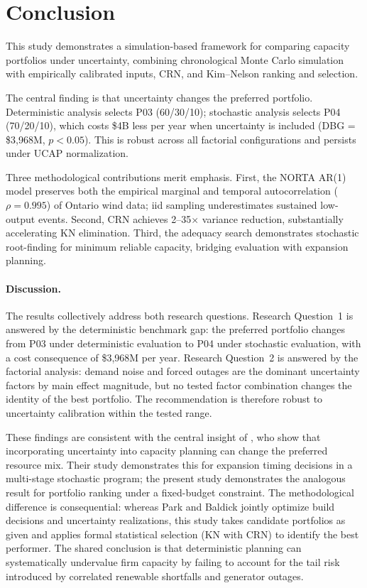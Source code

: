 \documentclass[11pt]{article}
\begin{document}
\section{Conclusion}\label{sec:conclusion}

This study demonstrates a simulation-based framework for comparing capacity portfolios under uncertainty, combining chronological Monte Carlo simulation with empirically calibrated inputs, CRN, and Kim--Nelson ranking and selection.

The central finding is that uncertainty changes the preferred portfolio. Deterministic analysis selects P03 (60/30/10); stochastic analysis selects P04 (70/20/10), which costs \$4B less per year when uncertainty is included (DBG = \$3,968M, $p < 0.05$). This is robust across all factorial configurations and persists under UCAP normalization.

Three methodological contributions merit emphasis. First, the NORTA AR(1) model preserves both the empirical marginal and temporal autocorrelation ($\rho = 0.995$) of Ontario wind data; iid sampling underestimates sustained low-output events. Second, CRN achieves 2--35$\times$ variance reduction, substantially accelerating KN elimination. Third, the adequacy search demonstrates stochastic root-finding for minimum reliable capacity, bridging evaluation with expansion planning.

\paragraph{Discussion.}
The results collectively address both research questions. Research Question~1 is answered by the deterministic benchmark gap: the preferred portfolio changes from P03 under deterministic evaluation to P04 under stochastic evaluation, with a cost consequence of \$3,968M per year. Research Question~2 is answered by the factorial analysis: demand noise and forced outages are the dominant uncertainty factors by main effect magnitude, but no tested factor combination changes the identity of the best portfolio. The recommendation is therefore robust to uncertainty calibration within the tested range.

These findings are consistent with the central insight of \citet{ParkBaldick2016}, who show that incorporating uncertainty into capacity planning can change the preferred resource mix. Their study demonstrates this for expansion timing decisions in a multi-stage stochastic program; the present study demonstrates the analogous result for portfolio ranking under a fixed-budget constraint. The methodological difference is consequential: whereas Park and Baldick jointly optimize build decisions and uncertainty realizations, this study takes candidate portfolios as given and applies formal statistical selection (KN with CRN) to identify the best performer. The shared conclusion is that deterministic planning can systematically undervalue firm capacity by failing to account for the tail risk introduced by correlated renewable shortfalls and generator outages.
\end{document}
